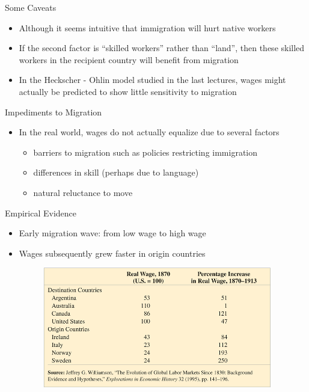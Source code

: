 \documentclass[10pt,hyperref={CJKbookmarks=true},xcolor=dvipsnames,aspectratio=169]{beamer}
\begin{document}
\begin{frame}{Some Caveats }

\begin{itemize}
\item Although it seems intuitive that immigration will hurt native workers
\item If the second factor is “skilled workers” rather than “land”, then
these skilled workers in the recipient country will benefit from migration 
\item In the Heckscher - Ohlin model studied in the last lectures,
wages might actually be predicted to show little sensitivity to migration 
\end{itemize}
\end{frame}

\begin{frame}{Impediments to Migration }

\begin{itemize}
\item In the real world, wages do not actually equalize due to several factors

\begin{itemize}
\item barriers to migration such as policies restricting immigration 
\item differences in skill (perhaps due to language) 
\item natural reluctance to move 
\end{itemize}
\end{itemize}
\end{frame}

\begin{frame}{Empirical Evidence}

\begin{itemize}
\item Early migration wave: from low wage to high wage 
\item Wages subsequently grew faster in origin countries
\begin{figure}


\begin{centering}
\includegraphics[width=10cm]{fig/migration/lec4-31}
\par\end{centering}

\end{figure}

\end{itemize}
\end{frame}
\end{document}
